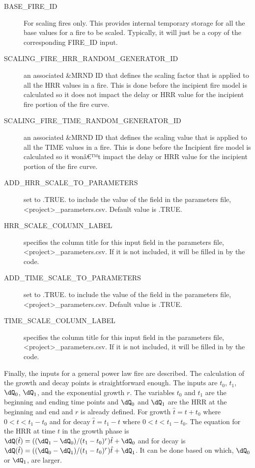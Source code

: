 \documentclass[12pt,twoside]{book}
\begin{document}
\begin{description}
  \item[BASE\_FIRE\_ID] For scaling fires only. This provides internal temporary storage for all the base values for a fire to be scaled. Typically, it will just be a copy of the corresponding {\ct FIRE\_ID} input.
  \item[SCALING\_FIRE\_HRR\_RANDOM\_GENERATOR\_ID] an associated {\ct \&MRND} ID that defines the scaling factor that is applied to all the HRR values in a fire. This is done before the incipient fire model is calculated so it does not impact the delay or HRR value for the incipient fire portion of the fire curve.
  \item[SCALING\_FIRE\_TIME\_RANDOM\_GENERATOR\_ID] an associated {\ct \&MRND} ID that defines the  scaling value that is applied to all the TIME values in a fire. This is done before the Incipient fire model is calculated so it wonâ€™t impact the delay or HRR value for the incipient portion of the fire curve.
  \item[ADD\_HRR\_SCALE\_TO\_PARAMETERS] set to .TRUE. to include the value of the field in the parameters file, {\ct <project>\_parameters.csv}. Default value is .TRUE.
  \item[HRR\_SCALE\_COLUMN\_LABEL] specifies the column title for this input field in the parameters file, {\ct <project>\_parameters.csv}. If it is not included, it will be filled in by the code.
  \item[ADD\_TIME\_SCALE\_TO\_PARAMETERS] set to .TRUE. to include the value of the field in the parameters file, {\ct <project>\_parameters.csv}. Default value is .TRUE.
  \item[TIME\_SCALE\_COLUMN\_LABEL] specifies the column title for this input field in the parameters file, {\ct <project>\_parameters.csv}. If it is not included, it will be filled in by the code.
  \end{description}
  Finally, the inputs for a general power law fire are described. The calculation of the growth and decay points is straightforward enough. The inputs are $t_0$, $t_1$, $\dQ_0$, $\dQ_1$, and the exponential growth $r$. The variables $t_0$ and $t_1$ are the beginning and ending time points and $\dQ_0$ and $\dQ_1$ are the HRR at the beginning and end and $r$ is already defined. For growth $\hat{t} = t + t_0$ where $0<t<t_1 - t_0$ and for decay $\hat{t} = t_1 - t$ where $0<t<t_1 - t_0$. The equation for the HRR at time $t$ in the growth phase is $\dQ(\hat{t}) = ((\dQ_1 - \dQ_0)/(t_1-t_0)^r)\hat{t} + \dQ_0$ and for decay is $\dQ(\hat{t}) = ((\dQ_0 - \dQ_1)/(t_1-t_0)^r)\hat{t} + \dQ_1$. It can be done based on which, $\dQ_0$ or $\dQ_1$, are larger.
\end{document}
